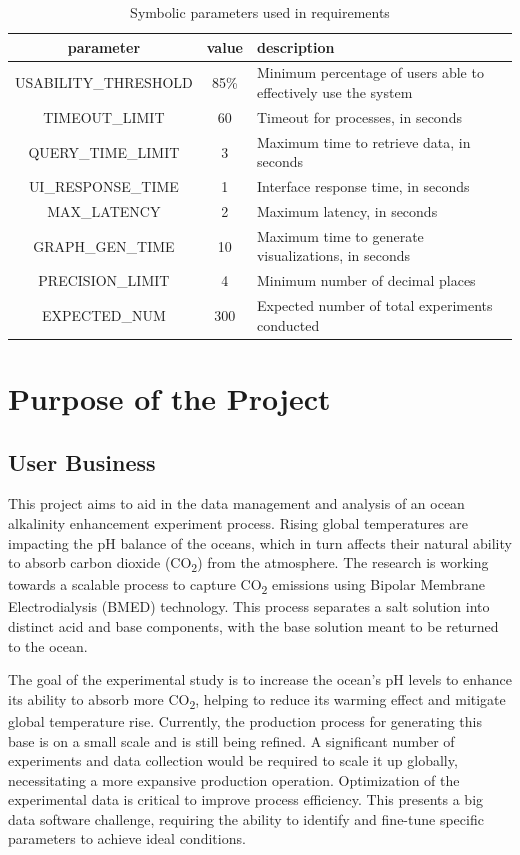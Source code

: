 \documentclass[12pt]{article}
\begin{document}
\begin{table}[htb]
  \caption{Symbolic parameters used in requirements}
  \label{SYM_PAR}
  \centering
  \begin{tabular}{c c p{6cm}}
    \toprule
    \textbf{parameter} & \textbf{value} & \textbf{description}\\
    \midrule 
    USABILITY\_THRESHOLD & 85\% & Minimum percentage of users able to effectively use the system\\
    TIMEOUT\_LIMIT & 60 & Timeout for processes, in seconds\\
    QUERY\_TIME\_LIMIT & 3 & Maximum time to retrieve data, in seconds\\
    UI\_RESPONSE\_TIME & 1 & Interface response time, in seconds\\
    MAX\_LATENCY & 2 & Maximum latency, in seconds\\
    GRAPH\_GEN\_TIME & 10 & Maximum time to generate visualizations, in
    seconds\\
    PRECISION\_LIMIT & 4 & Minimum number of decimal places\\
    EXPECTED\_NUM & 300 & Expected number of total experiments conducted\\
    \bottomrule
  \end{tabular}
\end{table}

\section{Purpose of the Project}
\subsection{User Business}
This project aims to aid in the data management and analysis of an ocean
alkalinity enhancement experiment process. Rising global temperatures are
impacting the pH balance of the oceans, which in turn affects their natural
ability to absorb carbon dioxide (CO\textsubscript{2}) from the atmosphere. The
research is working towards a scalable process to capture CO\textsubscript{2}
emissions using Bipolar Membrane Electrodialysis (BMED) technology. This process
separates a salt solution into distinct acid and base components, with the base
solution meant to be returned to the ocean.

\noindent The goal of the experimental study is to increase the ocean's pH
levels to enhance its ability to absorb more CO\textsubscript{2}, helping to
reduce its warming effect and mitigate global temperature rise. Currently, the
production process for generating this base is on a small scale and is
still being refined. A significant number of experiments and data collection
would be required to scale it up globally, necessitating a more expansive
production operation. Optimization of the experimental data is critical to
improve process efficiency. This presents a big data software challenge,
requiring the ability to identify and fine-tune specific parameters to achieve
ideal conditions.
\end{document}
